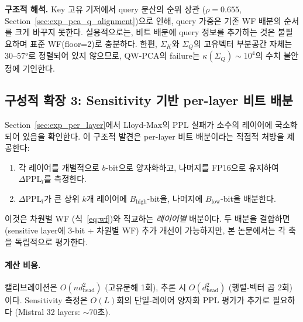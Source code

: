 \textbf{구조적 해석.} Key 고유 기저에서 query 분산의 순위 상관 ($\rho = 0.655$, Section~\ref{sec:exp_pca_q_alignment})으로 인해, query 가중은 기존 WF 배분의 순서를 크게 바꾸지 못한다. 실용적으로는, 비트 배분에 query 정보를 추가하는 것은 불필요하며 표준 WF(floor=2)로 충분하다. 한편, $\Sigma_K$와 $\Sigma_Q$의 고유벡터 부분공간 자체는 30--57°로 정렬되어 있지 않으므로, QW-PCA의 failure는 $\kappa(\Sigma_Q) \sim 10^4$의 수치 불안정에 기인한다.

\subsection{구성적 확장 3: Sensitivity 기반 per-layer 비트 배분}
\label{sec:method_sensitivity}

Section~\ref{sec:exp_per_layer}에서 Lloyd-Max의 PPL 실패가 소수의 레이어에 국소화되어 있음을 확인한다. 이 구조적 발견은 per-layer 비트 배분이라는 직접적 처방을 제공한다:

\begin{enumerate}[leftmargin=1.5em,itemsep=2pt]
\item 각 레이어를 개별적으로 $b$-bit으로 양자화하고, 나머지를 FP16으로 유지하여 $\Delta\mathrm{PPL}_l$를 측정한다.
\item $\Delta\mathrm{PPL}_l$가 큰 상위 $k$개 레이어에 $B_{\mathrm{high}}$-bit을, 나머지에 $B_{\mathrm{low}}$-bit을 배분한다.
\end{enumerate}

이것은 차원별 WF (식~\ref{eq:wf})와 직교하는 \emph{레이어별} 배분이다. 두 배분을 결합하면 (sensitive layer에 3-bit + 차원별 WF) 추가 개선이 가능하지만, 본 논문에서는 각 축을 독립적으로 평가한다.

\paragraph{계산 비용.} 캘리브레이션은 $O(n d_{\mathrm{head}}^2)$ (고유분해 1회), 추론 시 $O(d_{\mathrm{head}}^2)$ (행렬-벡터 곱 2회)이다. Sensitivity 측정은 $O(L)$회의 단일-레이어 양자화 PPL 평가가 추가로 필요하다 (Mistral 32 layers: $\sim$70초).
